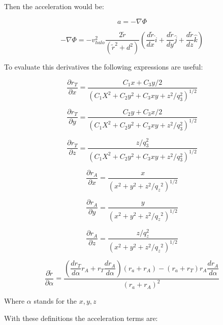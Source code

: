 Then the acceleration would be:

\begin{equation}
a = -\nabla \Phi 
\end{equation}

\begin{equation}
-\nabla \Phi = -v_{halo}^2 \dfrac{2 \tilde{r} }{ (\tilde{r}^2 + d^2)} \left(  \dfrac{d\tilde{r}}{dx} \hat{i} + \dfrac{d\tilde{r}}{dy} \hat{j} + \dfrac{d\tilde{r}}{dz} \hat{k}    \right)
\end{equation}

To evaluate this derivatives the following expressions are useful:

\begin{equation}
\dfrac{\partial r_T}{\partial x} = \dfrac{C_1x + C_3y/2}{(C_1X^2 + C_2y^2 + C_3xy + z^2/q_3^2)^{1/2}}
\end{equation}

\begin{equation}
\dfrac{\partial r_T}{\partial y} = \dfrac{C_2y + C_3x/2}{(C_1X^2 + C_2y^2 + C_3xy + z^2/q_3^2)^{1/2}}
\end{equation}

\begin{equation}
\dfrac{\partial r_T}{\partial z} = \dfrac{z/q_3^2}{(C_1X^2 + C_2y^2 + C_3xy + z^2/q_3^2)^{1/2}}
\end{equation}

\begin{equation}
\dfrac{\partial r_A}{\partial x} = \dfrac{x}{(x^2 + y^2 + z^2/{q_z}^2)^{1/2}}
\end{equation}

\begin{equation}
\dfrac{\partial r_A}{\partial y} = \dfrac{y}{(x^2 + y^2 + z^2/{q_z}^2)^{1/2}}
\end{equation}

\begin{equation}
\dfrac{\partial r_A}{\partial z} = \dfrac{z/q_z^2}{(x^2 + y^2 + z^2/{q_z}^2)^{1/2}}
\end{equation}

\begin{equation}
\dfrac{\partial \tilde{r}}{\partial \alpha} = \dfrac{\left( \dfrac{dr_T}{d\alpha} r_A + r_T \dfrac{dr_A}{d\alpha}\right) (r_a + r_A) - (r_a + r_T)r_A \dfrac{dr_A}{d\alpha} }{(r_a + r_A)^2}
\end{equation}

Where $\alpha$ stands for the $x, y, z$

With these definitions the acceleration terms are:

